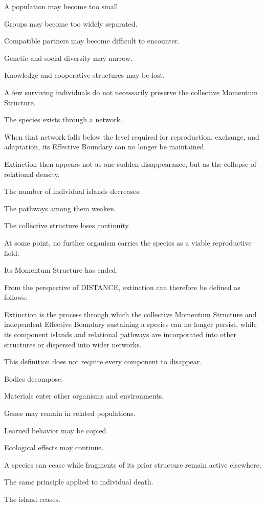 A population may become too small.

Groups may become too widely separated.

Compatible partners may become difficult to encounter.

Genetic and social diversity may narrow.

Knowledge and cooperative structures may be lost.

A few surviving individuals do not necessarily preserve the collective Momentum Structure.

The species exists through a network.

When that network falls below the level required for reproduction, exchange, and adaptation, its Effective Boundary can no longer be maintained.

Extinction then appears not as one sudden disappearance, but as the collapse of relational density.

The number of individual islands decreases.

The pathways among them weaken.

The collective structure loses continuity.

At some point, no further organism carries the species as a viable reproductive field.

Its Momentum Structure has ended.

From the perspective of DISTANCE, extinction can therefore be defined as follows:

Extinction is the process through which the collective Momentum Structure and independent Effective Boundary sustaining a species can no longer persist, while its component islands and relational pathways are incorporated into other structures or dispersed into wider networks.

This definition does not require every component to disappear.

Bodies decompose.

Materials enter other organisms and environments.

Genes may remain in related populations.

Learned behavior may be copied.

Ecological effects may continue.

A species can cease while fragments of its prior structure remain active elsewhere.

The same principle applied to individual death.

The island ceases.

